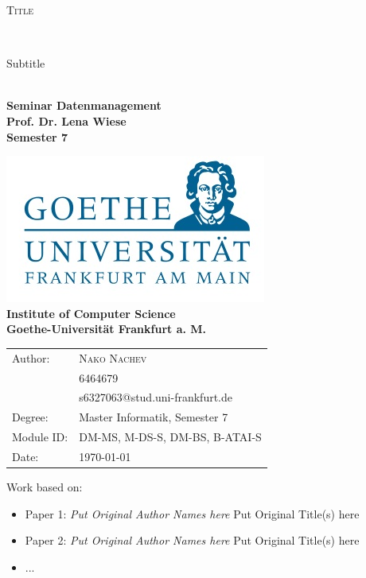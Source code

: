 \documentclass[12pt]%
{article}
\begin{document}
\begin{titlepage}

\begin{center}

{\Huge %
 
{%
\textsc{Title}}}
\\[2ex]

{\large %

{Subtitle}}\\[0.5cm]


\textbf{
\Large Seminar Datenmanagement\\ 
Prof. Dr. Lena Wiese \\ 
Semester 7
}

\includegraphics[scale=0.4]{logo.jpg} \\ 
\large{\textbf{Institute of Computer Science \\ Goethe-Universit\"at Frankfurt a. M.}}



\begin{Large}
\begin{tabular}{ll}
Author: & \textsc{Nako Nachev} \\
& 6464679\\
& s6327063@stud.uni-frankfurt.de \\
Degree:&  Master Informatik, Semester 7 \\
Module ID: & DM-MS, M-DS-S, DM-BS, B-ATAI-S \\
Date: & \today \\		
\end{tabular}
\end{Large}

\end{center}

\vspace*{\fill}

\large
\noindent{}Work based on: \\
\begin{itemize}
\item Paper 1: \emph{Put Original Author Names here} Put Original Title(s) here
\item Paper 2: \emph{Put Original Author Names here} Put Original Title(s) here
\item ...
\end{itemize}


\end{titlepage}
\end{document}
